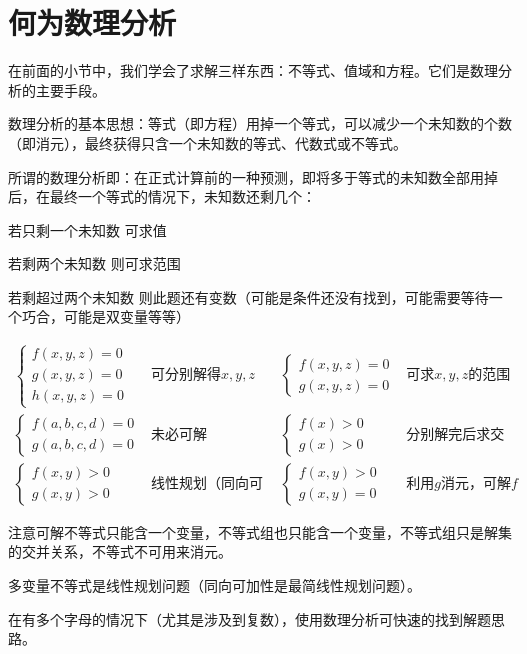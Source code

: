 \section{何为数理分析}
在前面的小节中，我们学会了求解三样东西：不等式、值域和方程。它们是数理分析的主要手段。

数理分析的基本思想：等式（即方程）用掉一个等式，可以减少一个未知数的个数（即消元），最终获得只含一个未知数的等式、代数式或不等式。

所谓的数理分析即：在正式计算前的一种预测，即将多于等式的未知数全部用掉后，在最终一个等式的情况下，未知数还剩几个：

\begin{desclist}
	\item[若只剩一个未知数] 可求值
	\item[若剩两个未知数] 则可求范围
	\item[若剩超过两个未知数] 则此题还有变数（可能是条件还没有找到，可能需要等待一个巧合，可能是双变量等等）
\end{desclist}
\[\begin{aligned}
	\begin{cases}
		f(x,y,z)=0 \\
		g(x,y,z)=0 \\
		h(x,y,z)=0
	\end{cases}&\text{可分别解得$x,y,z$}
	&\begin{cases}
		f(x,y,z)=0 \\
		g(x,y,z)=0
	\end{cases}&\text{可求$x,y,z$的范围} \\
	\begin{cases}
		f(a,b,c,d)=0 \\
		g(a,b,c,d)=0
	\end{cases}&\text{未必可解}
	&\begin{cases}
		f(x)>0 \\
		g(x)>0
	\end{cases}&\text{分别解完后求交集} \\
	\begin{cases}
		f(x,y)>0 \\
		g(x,y)>0
	\end{cases}&\text{线性规划（同向可加）}
	&\begin{cases}
		f(x,y)>0 \\
		g(x,y)=0
	\end{cases}&\text{利用$g$消元，可解$f$}
\end{aligned}\]

注意可解不等式只能含一个变量，不等式组也只能含一个变量，不等式组只是解集的交并关系，不等式不可用来消元。

多变量不等式是线性规划问题（同向可加性是最简线性规划问题）。

在有多个字母的情况下（尤其是涉及到复数），使用数理分析可快速的找到解题思路。
